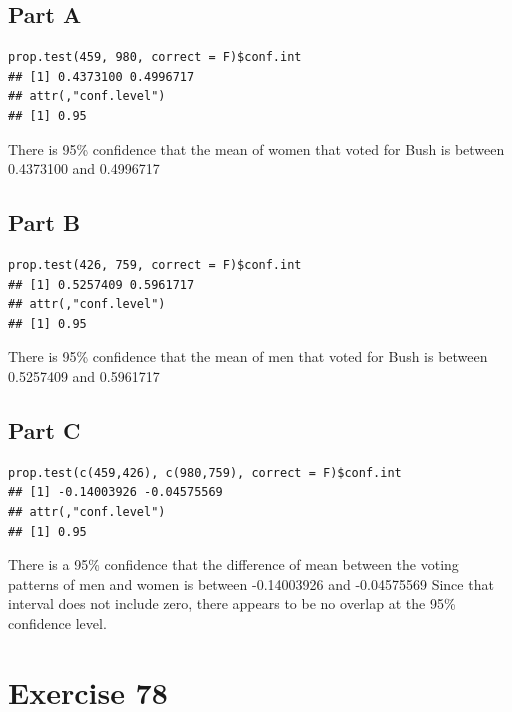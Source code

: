 \documentclass{article}\usepackage[]{graphicx}\usepackage[]{color}
\makeatletter
\newenvironment{kframe}{%
 \def\at@end@of@kframe{}%
 \ifinner\ifhmode%
  \def\at@end@of@kframe{\end{minipage}}%
  \begin{minipage}{\columnwidth}%
 \fi\fi%
 \def\FrameCommand##1{\hskip\@totalleftmargin \hskip-\fboxsep
 \colorbox{shadecolor}{##1}\hskip-\fboxsep
     \hskip-\linewidth \hskip-\@totalleftmargin \hskip\columnwidth}%
 \MakeFramed {\advance\hsize-\width
   \@totalleftmargin\z@ \linewidth\hsize
   \@setminipage}}%
 {\par\unskip\endMakeFramed%
 \at@end@of@kframe}
\newenvironment{knitrout}{}{} %
\makeatother
\begin{document}
\subsection*{Part A}
\begin{knitrout}
\color{fgcolor}\begin{kframe}
\begin{verbatim}
prop.test(459, 980, correct = F)$conf.int
## [1] 0.4373100 0.4996717
## attr(,"conf.level")
## [1] 0.95
\end{verbatim}
\end{kframe}
\end{knitrout}
There is 95\% confidence that the mean of women that voted for Bush is between 0.4373100 and 0.4996717
\subsection*{Part B}
\begin{knitrout}
\color{fgcolor}\begin{kframe}
\begin{verbatim}
prop.test(426, 759, correct = F)$conf.int
## [1] 0.5257409 0.5961717
## attr(,"conf.level")
## [1] 0.95
\end{verbatim}
\end{kframe}
\end{knitrout}
There is 95\% confidence that the mean of men that voted for Bush is between 0.5257409 and 0.5961717
\subsection*{Part C}
\begin{knitrout}
\color{fgcolor}\begin{kframe}
\begin{verbatim}
prop.test(c(459,426), c(980,759), correct = F)$conf.int 
## [1] -0.14003926 -0.04575569
## attr(,"conf.level")
## [1] 0.95
\end{verbatim}
\end{kframe}
\end{knitrout}
There is a 95\% confidence that the difference of mean between the voting patterns of men and women is between -0.14003926 and -0.04575569 Since that interval does not include zero, there appears to be no overlap at the 95\% confidence level.
\section*{Exercise 78}
\end{document}
